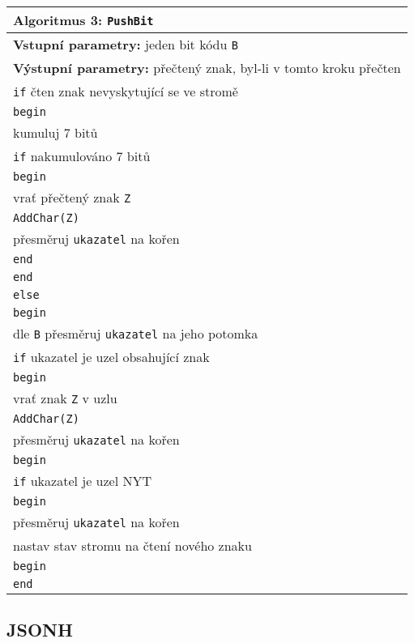 \begin{table}[!h]
\centering
\begin{tabular}{l}
\hline
\textbf{Algoritmus 3:} \texttt{PushBit}\\
\hline
\textbf{Vstupní parametry:} jeden bit kódu \texttt{B}\\
\textbf{Výstupní parametry:} přečtený znak, byl-li v tomto kroku přečten\\
\hline
\texttt{if} čten znak nevyskytující se ve stromě\\
\texttt{begin}\\
\hspace*{5mm}kumuluj 7 bitů\\
\hspace*{5mm}\texttt{if} nakumulováno 7 bitů\\
\hspace*{5mm}\texttt{begin}\\
\hspace*{10mm}vrať přečtený znak \texttt{Z}\\
\hspace*{10mm}\texttt{AddChar(Z)}\\
\hspace*{10mm}přesměruj \texttt{ukazatel} na kořen\\
\hspace*{5mm}\texttt{end}\\
\texttt{end}\\
\texttt{else}\\
\texttt{begin}\\
\hspace*{5mm}dle \texttt{B} přesměruj \texttt{ukazatel} na jeho potomka\\
\hspace*{5mm}\texttt{if} ukazatel je uzel obsahující znak\\
\hspace*{5mm}\texttt{begin}\\
\hspace*{10mm}vrať znak \texttt{Z} v uzlu\\
\hspace*{10mm}\texttt{AddChar(Z)}\\
\hspace*{10mm}přesměruj \texttt{ukazatel} na kořen\\
\hspace*{5mm}\texttt{begin}\\
\hspace*{5mm}\texttt{if} ukazatel je uzel NYT\\
\hspace*{5mm}\texttt{begin}\\
\hspace*{10mm}přesměruj \texttt{ukazatel} na kořen\\
\hspace*{10mm}nastav stav stromu na čtení nového znaku\\
\hspace*{5mm}\texttt{begin}\\
\texttt{end}\\
\hline
\end{tabular}
\end{table}

\subsection{JSONH}
